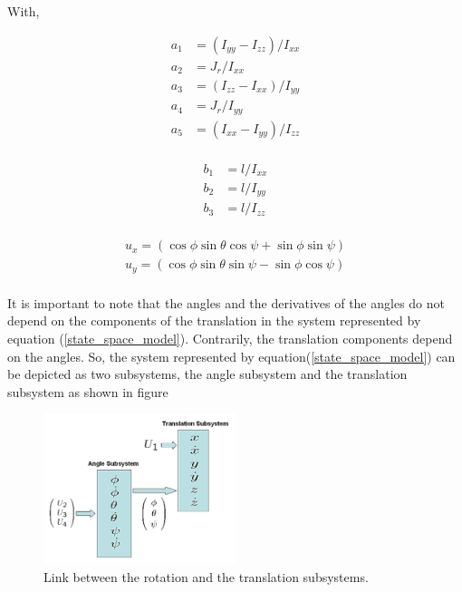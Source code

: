 \documentclass{thesisreport}
\begin{document}
With, 

\begin{multicols}{2}
 
\begin{equation*}
\begin{aligned}
a_1 &= (I_{yy} - I_{zz})/I_{xx}\\
a_2 &= J_r/I_{xx}\\
a_3 &= (I_{zz} - I_{xx})/I_{yy}\\
a_4 &= J_r/I_{yy}\\
a_5 &= (I_{xx} - I_{yy})/I_{zz}\\
\end{aligned}
\end{equation*}

\columnbreak

\begin{equation}
\begin{aligned}
b_1 &= l/I_{xx}\\
b_2 &=l/I_{yy}\\
b_3 &= l/I_{zz}\\
\end{aligned}
\end{equation}

\end{multicols}

\begin{equation}
	\begin{aligned}
	u_x = (\cos \phi \sin \theta \cos \psi + \sin \phi \sin \psi)\\
	u_y = (\cos \phi \sin \theta \sin \psi - \sin \phi \cos \psi)\\
	\end{aligned}
\end{equation}

It is important to note that the angles and the derivatives of the angles do not depend on the components of the translation in the system represented by equation (\ref{state_space_model}). Contrarily, the translation components depend on the angles. So, the system represented by equation(\ref{state_space_model}) can be depicted as two subsystems, the angle subsystem and the translation subsystem as shown in figure 

\begin{figure}[h]
\centering 
\includegraphics[width=0.5\textwidth]{Images/Modeling/subsystems}
\caption{Link between the rotation and the translation subsystems.\cite{Bouabdalla2007}}
\end{figure}
\end{document}
